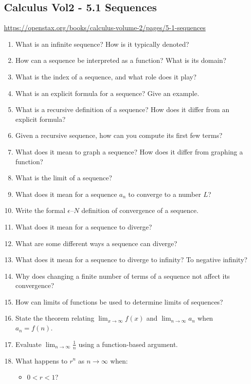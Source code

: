 \subsection{Calculus Vol2 - 5.1 Sequences}

\url{https://openstax.org/books/calculus-volume-2/pages/5-1-sequences}

\begin{enumerate}
  \item What is an infinite sequence? How is it typically denoted?
  \item How can a sequence be interpreted as a function? What is its domain?
  \item What is the index of a sequence, and what role does it play?
  \item What is an explicit formula for a sequence? Give an example.
  \item What is a recursive definition of a sequence? How does it differ from an explicit formula?
  \item Given a recursive sequence, how can you compute its first few terms?
  \item What does it mean to graph a sequence? How does it differ from graphing a function?
  \item What is the limit of a sequence?
  \item What does it mean for a sequence \({a_{n}}\) to converge to a number \(L\)?
  \item Write the formal \(\epsilon\)–\(N\) definition of convergence of a sequence.
  \item What does it mean for a sequence to diverge?
  \item What are some different ways a sequence can diverge?
  \item What does it mean for a sequence to diverge to infinity? To negative infinity?
  \item Why does changing a finite number of terms of a sequence not affect its convergence?
  \item How can limits of functions be used to determine limits of sequences?
  \item State the theorem relating \(\lim_{x\to\infty}f(x)\) and \(\lim_{n\to\infty}a_{n}\) when \(a_{n} = f(n)\).
  \item Evaluate \(\lim_{n\to\infty}\frac{1}{n}\) using a function-based argument.
  \item What happens to \(r^{n}\) as \(n \to \infty\) when:
    \begin{itemize}
      \item \(0 < r < 1\)?

\end{itemize}
\end{enumerate}
